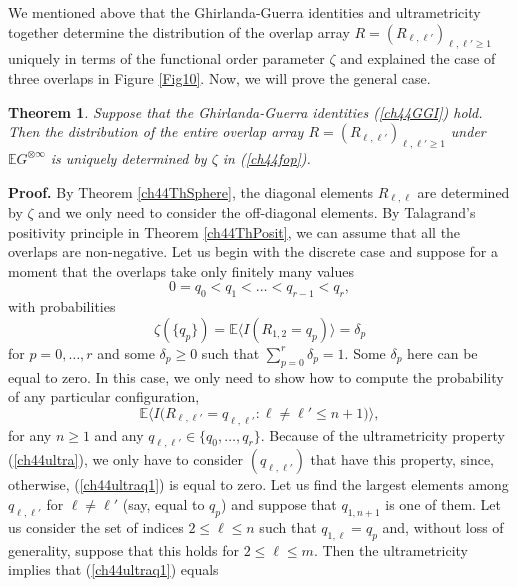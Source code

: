 \documentclass[12pt]{article}
\newcommand{\e}{\mathbb{E}}
\newcommand{\la}{\langle}
\newcommand{\ra}{\rangle}
\newtheorem{theorem}{Theorem}
\theoremstyle{nonumberplain}
\begin{document}
We mentioned above that the Ghirlanda-Guerra identities and ultrametricity together determine the distribution of the overlap array $R=(R_{\ell,\ell'})_{\ell,\ell'\geq 1}$ uniquely in terms of the functional order parameter $\zeta$ and explained the case of three overlaps in Figure \ref{Fig10}. Now, we will prove the general case.

\begin{theorem}\label{ch44Th1}
Suppose that the Ghirlanda-Guerra identities (\ref{ch44GGI}) hold. Then the distribution of the entire overlap array $R=(R_{\ell,\ell'})_{\ell,\ell'\geq 1}$ under $\e G^{\otimes \infty}$ is uniquely determined by $\zeta$ in (\ref{ch44fop}). 
\end{theorem}
\noindent\textbf{Proof.}
By Theorem \ref{ch44ThSphere}, the diagonal elements $R_{\ell,\ell}$ are determined by $\zeta$ and we only need to consider the off-diagonal elements. By Talagrand's positivity principle in Theorem \ref{ch44ThPosit}, we can assume that all the overlaps are non-negative. Let us begin with the discrete case and suppose for a moment that the overlaps take only finitely many values 
\begin{equation}
0=q_0<q_1<\ldots<q_{r-1}<q_r,
\label{ch44qsagain}
\end{equation}
with probabilities 
\begin{equation}
\zeta(\{q_p\})
=
\e \bigl\la I(R_{1,2} = q_p) \bigr\ra
=
\delta_{p} 
\label{ch44overlapdist}
\end{equation}
for $p=0,\ldots, r$ and some $\delta_p\geq 0$ such that $\sum_{p=0}^r \delta_p= 1$. Some $\delta_p$ here can be equal to zero. In this case, we only need to show how to compute the probability of any particular configuration, 
\begin{equation}
\e \bigl\la I\bigl(R_{\ell,\ell'} = q_{\ell,\ell'} : \ell\not = \ell'\leq n+1\bigr) \bigr\ra,
\label{ch44ultraq1}
\end{equation}
for any $n\geq 1$ and any $q_{\ell,\ell'}\in \{q_0,\ldots, q_r\}$. Because of the ultrametricity property (\ref{ch44ultra}), we only have to consider $(q_{\ell,\ell'})$ that have this property, since, otherwise, (\ref{ch44ultraq1}) is equal to zero. Let us find the largest elements among $q_{\ell,\ell'}$ for $\ell\not = \ell'$ (say, equal to $q_p$) and suppose that $q_{1,n+1}$ is one of them. Let us consider the set of indices $2\leq \ell\leq n$ such that $q_{1,\ell} = q_{p}$ and, without loss of generality, suppose that this holds for $2\leq \ell\leq m$. Then the ultrametricity implies that (\ref{ch44ultraq1}) equals
\end{document}
